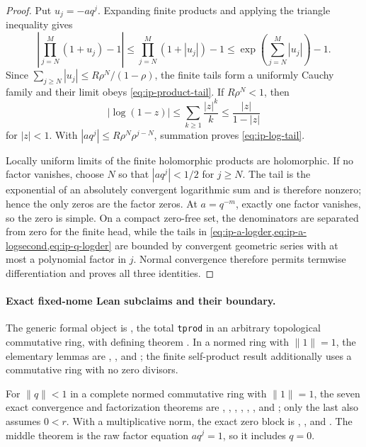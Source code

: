 \begin{proof}
Put \(u_j=-aq^j\).  Expanding finite products and applying the triangle
inequality gives
\[
 \left|\prod_{j=N}^{M}(1+u_j)-1\right|
 \leq\prod_{j=N}^{M}(1+|u_j|)-1
 \leq\exp\left(\sum_{j=N}^{M}|u_j|\right)-1.
\]
Since \(\sum_{j\geq N}|u_j|\leq R\rho^N/(1-\rho)\), the finite tails form a
uniformly Cauchy family and their limit obeys \cref{eq:ip-product-tail}.  If
\(R\rho^N<1\), then
\[
 |\log(1-z)|\leq\sum_{k\geq1}\frac{|z|^k}{k}
 \leq\frac{|z|}{1-|z|}
\]
for \(|z|<1\).  With \(|aq^j|\leq R\rho^N\rho^{j-N}\), summation proves
\cref{eq:ip-log-tail}.

Locally uniform limits of the finite holomorphic products are holomorphic.
If no factor vanishes, choose \(N\) so that \(|aq^j|<1/2\) for \(j\geq N\).
The tail is the exponential of an absolutely convergent logarithmic sum and
is therefore nonzero; hence the only zeros are the factor zeros.  At
\(a=q^{-m}\), exactly one factor vanishes, so the zero is simple.  On a compact
zero-free set, the denominators are separated from zero for the finite head,
while the tails in \cref{eq:ip-a-logder,eq:ip-a-logsecond,eq:ip-q-logder} are
bounded by convergent geometric series with at most a polynomial factor in
\(j\).  Normal convergence therefore permits termwise differentiation and
proves all three identities.
\end{proof}

\paragraph{Exact fixed-nome Lean subclaims and their boundary.}
The generic formal object is , the total
\texttt{tprod} in an arbitrary topological commutative ring, with defining
theorem .  In a normed ring with
\(\lVert1\rVert=1\), the elementary lemmas are
,
, and
; the finite self-product result
 additionally uses a
commutative ring with no zero divisors.

For \(\lVert q\rVert<1\) in a complete normed commutative ring with
\(\lVert1\rVert=1\), the seven exact convergence and factorization theorems
are
,
,
,
,
,
, and
; only the last also assumes
\(0<r\).  With a multiplicative norm, the exact zero block is
,
, and
.  The middle theorem is the raw
factor equation \(aq^j=1\), so it includes \(q=0\).

